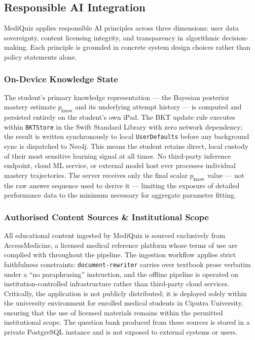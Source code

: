 \subsection*{Responsible AI Integration}

MediQuiz applies responsible AI principles across three dimensions: user data sovereignty,
content licensing integrity, and transparency in algorithmic decision-making.
Each principle is grounded in concrete system design choices rather than policy statements alone.

\subsubsection*{On-Device Knowledge State}

The student's primary knowledge representation --- the Bayesian posterior mastery
estimate $p_{\text{know}}$ and its underlying attempt history --- is computed and
persisted entirely on the student's own iPad. The BKT update rule executes within
\texttt{BKTStore} in the Swift Standard Library with zero network dependency; the
result is written synchronously to local \texttt{UserDefaults} before any background
sync is dispatched to Neo4j. This means the student retains direct, local custody of
their most sensitive learning signal at all times. No third-party inference endpoint,
cloud ML service, or external model host ever processes individual mastery trajectories.
The server receives only the final scalar $p_{\text{know}}$ value --- not the raw
answer sequence used to derive it --- limiting the exposure of detailed performance data
to the minimum necessary for aggregate parameter fitting.

\subsubsection*{Authorised Content Sources \& Institutional Scope}

All educational content ingested by MediQuiz is sourced exclusively from
AccessMedicine, a licensed medical reference platform whose terms of use are
complied with throughout the pipeline. The ingestion workflow applies strict
faithfulness constraints: \texttt{document-rewriter} carries over textbook prose
verbatim under a ``no paraphrasing'' instruction, and the offline pipeline is operated
on institution-controlled infrastructure rather than third-party cloud services.
Critically, the application is not publicly distributed; it is deployed solely within
the university environment for enrolled medical students in Ciputra University, ensuring that the use of
licensed materials remains within the permitted institutional scope. The question bank
produced from these sources is stored in a private PostgreSQL instance and is not
exposed to external systems or users.

